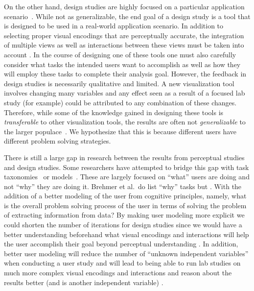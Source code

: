 On the other hand, design studies are highly focused on a particular
application scenario~\citep{Sedlmair:2012}. While not as generalizable, the end goal of a design
study is a tool that is designed to be used in a real-world application
scenario. In addition to selecting proper visual encodings that are
perceptually accurate, the integration of multiple views as well as
interactions between these views must be taken into account
. In the course of
designing one of these tools one must also carefully consider what tasks the
intended users want to accomplish as well as how they will employ these tasks
to complete their analysis goal. However, the feedback in design studies is
necessarily qualitative and limited. A new visualization tool involves changing
many variables and any effect seen as a result of a focused lab study
(for example) could be attributed to any combination of these changes.
Therefore, while some of the knowledge gained in designing these tools is
\emph{transferable} to other visualization tools, the results are often not
\emph{generalizable} to the larger populace~.
We hypothesize that this is because different
users have different problem solving strategies. 

There is still a large gap in research between the results from perceptual
studies and design studies. Some researchers have attempted to bridge this gap
with task taxonomies~\citep{Brehmer:2013,Shneiderman:1996} or 
models~\citep{Meyer:2012,Sacha:2014}.  These are largely focused on 
``what'' users are doing and not
``why'' they are doing it. Brehmer et al.\ do list ``why'' tasks but 
.
With the addition of
a better modeling of the user from cognitive principles, namely,
what is the overall problem solving process of the user in terms of solving the
problem of extracting information from data?  By making user modeling more
explicit we could shorten the number of iterations for design studies since we
would have a better understanding beforehand what visual encodings and
interactions will help the user accomplish their goal beyond perceptual
understanding 
. 
In addition, better user modeling will reduce the number of
``unknown independent variables'' when conducting a user study and will lead to
being able to run lab studies on much more complex visual encodings and
interactions and reason about the results better (and is another independent
variable) 
.

